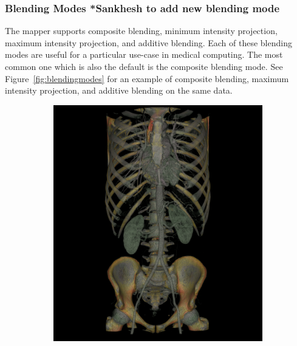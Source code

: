 \subsubsection{Blending Modes *Sankhesh to add new blending mode}
The mapper supports composite blending, minimum intensity projection, maximum intensity projection, and additive blending. Each of these blending modes are useful for a particular use-case in medical computing. The most common one which is also the default is the composite blending mode. See Figure~\ref{fig:blendingmodes} for an example of composite blending, maximum intensity projection, and additive blending on the same data.

\begin{figure}
\centering
\begin{subfigure}{.6\columnwidth}
    \includegraphics[width=\columnwidth]{TorsoBlendingComposite.png}
\end{subfigure}
\begin{subfigure}{.6\columnwidth}   

\end{subfigure}
\end{figure}
